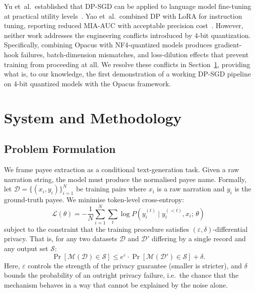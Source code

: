 \documentclass[conference]{IEEEtran}
\begin{document}
Yu et~al.\ established that DP-SGD can be applied to language model fine-tuning at practical utility levels~\cite{yu2022differentially}. Yao et~al.\ combined DP with LoRA for instruction tuning, reporting reduced MIA-AUC with acceptable precision cost~\cite{yao2024dplora}. However, neither work addresses the engineering conflicts introduced by 4-bit quantization. Specifically, combining Opacus with NF4-quantized models produces gradient-hook failures, batch-dimension mismatches, and loss-dilution effects that prevent training from proceeding at all. We resolve these conflicts in Section~\ref{sec:method}, providing what is, to our knowledge, the first demonstration of a working DP-SGD pipeline on 4-bit quantized models with the Opacus framework.

\section{System and Methodology}
\label{sec:method}

\subsection{Problem Formulation}

We frame payee extraction as a conditional text-generation task. Given a raw narration string, the model must produce the normalised payee name. Formally, let $\mathcal{D} = \{(x_i, y_i)\}_{i=1}^{N}$ be training pairs where $x_i$ is a raw narration and $y_i$ is the ground-truth payee. We minimise token-level cross-entropy:
\begin{equation}
  \mathcal{L}(\theta) = -\frac{1}{N} \sum_{i=1}^{N} \sum_{t} \log P\!\left(y_i^{(t)} \mid y_i^{(<t)}, x_i;\, \theta\right)
\end{equation}
subject to the constraint that the training procedure satisfies $(\varepsilon, \delta)$-differential privacy. That is, for any two datasets $\mathcal{D}$ and $\mathcal{D}'$ differing by a single record and any output set $\mathcal{S}$:
\begin{equation}
  \Pr[\mathcal{M}(\mathcal{D}) \in \mathcal{S}] \leq e^{\varepsilon} \cdot \Pr[\mathcal{M}(\mathcal{D}') \in \mathcal{S}] + \delta.
\end{equation}
Here, $\varepsilon$ controls the strength of the privacy guarantee (smaller is stricter), and $\delta$ bounds the probability of an outright privacy failure, i.e.\ the chance that the mechanism behaves in a way that cannot be explained by the noise alone.
\end{document}
